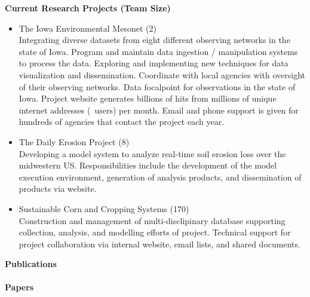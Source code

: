 \vspace*{0.25in}
\Large \bf Current Research Projects (Team Size)
\normalsize \sf
\begin{itemize}
\item The Iowa Environmental Mesonet (2)\\
 Integrating diverse datasets from eight
different observing networks in the state of Iowa.  Program and maintain data
ingestion / manipulation systems to process the data. Exploring and implementing 
new techniques for data visualization and dissemination.  Coordinate with local
agencies with oversight of their observing networks.  Data focalpoint for 
observations in the state of Iowa. Project website generates billions of hits 
from millions of unique internet addresses (~users) per month.  Email and 
phone support is given for hundreds of agencies that contact the project each
year.
\item The Daily Erosion Project (8)\\
Developing a model system to analyze real-time soil erosion loss over the 
midwestern US.  Responsibilities include the development of the model execution
environment, generation of analysis products, and dissemination of products 
via website.
\item Sustainable Corn and Cropping Systems (170)\\
Construction and management of multi-disclipinary database supporting collection, analysis, and modelling efforts of project.  Technical support for project
collaboration via internal website, email lists, and shared documents.
\end{itemize}
\Large \bf Publications\\ \\
\normalsize \bf Papers
\normalsize \sf
